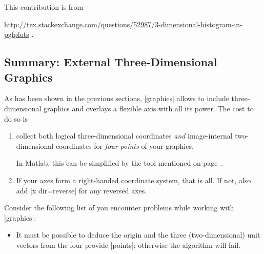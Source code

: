 {{This contribution is from

\noindent
\url{http://tex.stackexchange.com/questions/52987/3-dimensional-histogram-in-pgfplots} .


\subsection*{Summary: External Three-Dimensional Graphics}

As has been shown in the previous sections,  |graphics|
allows to include three-dimensional graphics and \PGFPlots{} overlays a
flexible axis with all its power. The cost to do so is
%
\begin{enumerate}
    \item collect both logical three-dimensional coordinates \emph{and}
        image-internal two-dimensional coordinates for \emph{four points} of
        your graphics.

        In Matlab, this can be simplified by the tool mentioned on
        page~\pageref{sec:plotgraphics3d:matlabscript}.
    \item If your axes form a right-handed coordinate system, that is all. If
        not, also add |x dir=reverse| for any reversed axes.
\end{enumerate}

\noindent Consider the following list of you encounter problems while working
with  |graphics|:
%
\begin{itemize}
    \item It must be possible to deduce the origin and the three
        (two-dimensional) unit vectors from the four provide |points|;
        otherwise the algorithm will fail.


\end{itemize}}}
